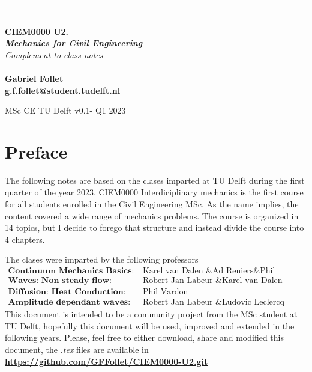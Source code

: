\documentclass[a4paper, 11pt,article,oneside]{memoir}%
\begin{document}
\noindent
\setlength{\parindent}{0pt}

\begin{titlingpage}
	\raggedleft %
	{\color{magenta}\rule{3 pt}{\textheight}} %
	\hspace{0.05\textwidth} %
	\parbox[b]{0.9\textwidth}{ %
	
		{\\\Huge\bfseries{ CIEM0000 U2.\\
		\textit{Mechanics for Civil Engineering}}}\\[3\baselineskip]  %
		{\large\textit{Complement to class notes }}\\[4\baselineskip] %
      	\\[4\baselineskip] 
		{\color{magenta}\textbf{Gabriel Follet\\g.f.follet@student.tudelft.nl}}
		
		\vspace{0.25\textheight} %
			{\noindent MSc CE TU Delft  v0.1- Q1 2023}} %

\end{titlingpage}
\section*{Preface}
The following notes are based on the clases imparted at TU Delft during the first quarter of the year 2023.
CIEM0000 Interdiciplinary mechanics is the first course for all students enrolled in the Civil Engineering MSc.
 As the name implies, the content covered a wide range of mechanics problems. The course is organized in 14 topics, but I decide to forego that structure and instead divide the course into 4 chapters.

The clases were imparted by the following professors
\begin{align*}
\textbf{Continuum Mechanics Basics: }&\text{Karel van Dalen \& Ad Reniers\&  Phil Vardon}\\
\textbf{Waves: Non-steady flow: }&\text{Robert Jan Labeur \& Karel van Dalen}\\
\textbf{Diffusion: Heat Conduction: }&\text{Phil Vardon}\\
\textbf{Amplitude dependant waves: }&\text{Robert Jan Labeur \& Ludovic Leclercq}
\end{align*} 
This document is intended to be a community project from the MSc student at TU Delft, hopefully this document will be used, improved and extended in the following years. 
Please, feel free to either download, share and modified this document, the \textit{.tex} files are available  in \textbf{{\color{magenta}\href{https://github.com/GFFollet/CIEM0000-U2.git}{https://github.com/GFFollet/CIEM0000-U2.git}}}
\end{document}
